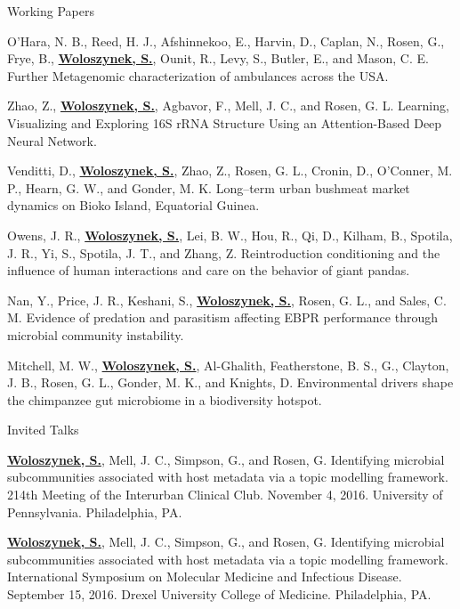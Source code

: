 \begin{cventries}
\vspace{.5cm}
\cventry
    {}
    {Working Papers}
    {}
    {}
    {
     \begin{cvitems} %
        \item{O’Hara, N. B., Reed, H. J., Afshinnekoo, E., Harvin, D., Caplan, N., Rosen, G., Frye, B., \textbf{\underline{Woloszynek, S.}}, Ounit, R., Levy, S., Butler, E., and Mason, C. E. Further Metagenomic characterization of ambulances across the USA.}
        \item{Zhao, Z., \textbf{\underline{Woloszynek, S.}}, Agbavor, F., Mell, J. C., and Rosen, G. L. Learning, Visualizing and Exploring 16S rRNA Structure Using an Attention-Based Deep Neural Network.}
        \item{Venditti, D., \textbf{\underline{Woloszynek, S.}}, Zhao, Z., Rosen, G. L., Cronin, D., O’Conner, M. P., Hearn, G. W., and Gonder, M. K. Long–term urban bushmeat market dynamics on Bioko Island, Equatorial Guinea. }
        \item{Owens, J. R., \textbf{\underline{Woloszynek, S.}}, Lei, B. W., Hou, R., Qi, D., Kilham, B., Spotila, J. R., Yi, S., Spotila, J. T., and Zhang, Z. Reintroduction conditioning and the influence of human interactions and care on the behavior of giant pandas.}
        \item{Nan, Y., Price, J. R., Keshani, S., \textbf{\underline{Woloszynek, S.}}, Rosen, G. L., and Sales, C. M. Evidence of predation and parasitism affecting EBPR performance through microbial community instability. }
        \item{Mitchell, M. W., \textbf{\underline{Woloszynek, S.}}, Al-Ghalith, Featherstone, B. S., G., Clayton, J. B., Rosen, G. L., Gonder, M. K., and Knights, D. Environmental drivers shape the chimpanzee gut microbiome in a biodiversity hotspot.}
      \end{cvitems}
    }
    
    
\vspace{.5cm}
\cventry
    {}
    {Invited Talks}
    {}
    {}
    {
     \begin{cvitems} %
        \item{\textbf{\underline{Woloszynek, S.}}, Mell, J. C., Simpson, G., and Rosen, G. Identifying microbial subcommunities associated with host metadata via a topic modelling framework. 214th Meeting of the Interurban Clinical Club. November 4, 2016. University of Pennsylvania. Philadelphia, PA.}
        \item{\textbf{\underline{Woloszynek, S.}}, Mell, J. C., Simpson, G., and Rosen, G. Identifying microbial subcommunities associated with host metadata via a topic modelling framework. International Symposium on Molecular Medicine and Infectious Disease. September 15, 2016. Drexel University College of Medicine. Philadelphia, PA.}
      \end{cvitems}
    }
    

\end{cventries}
